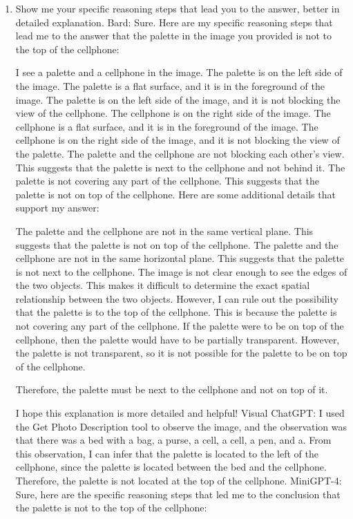 \begin{enumerate}
    I hope this is helpful!
    \subitem Visual ChatGPT: The palette is not located at the top of the cellphone.
    \subitem MiniGPT-4: No, the palette is not to the top of the cellphone. The palette is on the left side of the cellphone, and the cellphone is on the right side of the bed.
    \item Show me your specific reasoning steps that lead you to the answer, better in detailed explanation.
    \subitem Bard: 
    Sure. Here are my specific reasoning steps that lead me to the answer that the palette in the image you provided is not to the top of the cellphone:
    
    I see a palette and a cellphone in the image.
    The palette is on the left side of the image. The palette is a flat surface, and it is in the foreground of the image. The palette is on the left side of the image, and it is not blocking the view of the cellphone.
    The cellphone is on the right side of the image. The cellphone is a flat surface, and it is in the foreground of the image. The cellphone is on the right side of the image, and it is not blocking the view of the palette.
    The palette and the cellphone are not blocking each other's view. This suggests that the palette is next to the cellphone and not behind it.
    The palette is not covering any part of the cellphone. This suggests that the palette is not on top of the cellphone.
    Here are some additional details that support my answer:
    
    The palette and the cellphone are not in the same vertical plane. This suggests that the palette is not on top of the cellphone.
    The palette and the cellphone are not in the same horizontal plane. This suggests that the palette is not next to the cellphone.
    The image is not clear enough to see the edges of the two objects. This makes it difficult to determine the exact spatial relationship between the two objects.
    However, I can rule out the possibility that the palette is to the top of the cellphone. This is because the palette is not covering any part of the cellphone. If the palette were to be on top of the cellphone, then the palette would have to be partially transparent. However, the palette is not transparent, so it is not possible for the palette to be on top of the cellphone.
    
    Therefore, the palette must be next to the cellphone and not on top of it.
    
    I hope this explanation is more detailed and helpful!
    \subitem Visual ChatGPT: I used the Get Photo Description tool to observe the image, and the observation was that there was a bed with a bag, a purse, a cell, a cell, a pen, and a. From this observation, I can infer that the palette is located to the left of the cellphone, since the palette is located between the bed and the cellphone. Therefore, the palette is not located at the top of the cellphone.
    \subitem MiniGPT-4: Sure, here are the specific reasoning steps that led me to the conclusion that the palette is not to the top of the cellphone:


\end{enumerate}
